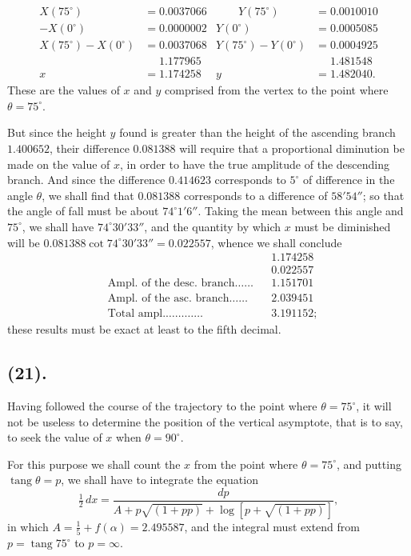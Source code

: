 \documentclass{article}
\begin{document}
\[ \begin{aligned} X(75^{\circ})&=0.0037066 &\qquad Y(75^{\circ})&=0.0010010\\ -X(0^{\circ})&=0.0000002 & Y(0^{\circ})&=0.0005085\\ X(75^{\circ})-X(0^{\circ})&=0.0037068 & Y(75^{\circ})-Y(0^{\circ})&=0.0004925\\ &\phantom{=}1.177965 & &\phantom{=}1.481548\\ x&=1.174258 & y&=1.482040. \end{aligned} \]
These are the values of $x$ and $y$ comprised from the vertex to the point where $\theta=75^{\circ}$.

But since the height $y$ found is greater than the height of the ascending branch $1.400652$, their difference $0.081388$ will require that a proportional diminution be made on the value of $x$, in order to have the true amplitude of the descending branch. And since the difference $0.414623$ corresponds to $5^{\circ}$ of difference in the angle $\theta$, we shall find that $0.081388$ corresponds to a difference of $58'54''$; so that the angle of fall must be about $74^{\circ}1'6''$. Taking the mean between this angle and $75^{\circ}$, we shall have $74^{\circ}30'33''$, and the quantity by which $x$ must be diminished will be $0.081388\cot 74^{\circ}30'33''=0.022557$, whence we shall conclude
\[ \begin{aligned} & && 1.174258\\ & && 0.022557\\ &\text{Ampl. of the desc. branch}\ldots\ldots && 1.151701\\ &\text{Ampl. of the asc. branch}\ldots\ldots && 2.039451\\ &\text{Total ampl.}\ldots\ldots\ldots\ldots && 3.191152; \end{aligned} \]
these results must be exact at least to the fifth decimal.

\subsection*{(21).}

Having followed the course of the trajectory to the point where $\theta=75^{\circ}$, it will not be useless to determine the position of the vertical asymptote, that is to say, to seek the value of $x$ when $\theta=90^{\circ}$.

For this purpose we shall count the $x$ from the point where $\theta=75^{\circ}$, and putting $\operatorname{tang}\theta=p$, we shall have to integrate the equation
\[ \tfrac{1}{2}\,dx=\frac{dp}{A+p\sqrt{(1+pp)}+\log[p+\sqrt{(1+pp)}]}, \]
in which $A=\frac{1}{5}+f(\alpha)=2.495587$, and the integral must extend from $p=\operatorname{tang}75^{\circ}$ to $p=\infty$.
\end{document}
